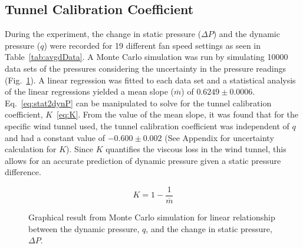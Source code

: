 \documentclass[journal,letterpaper]{IEEEtran}
\begin{document}
\subsection{Tunnel Calibration Coefficient}

During the experiment, the change in static pressure ($\Delta P$) and the dynamic pressure ($q$) were recorded for 19 different fan speed settings as seen in Table~\ref{tab:avgdData}.
A Monte Carlo simulation was run by simulating 10000 data sets of the pressures considering the uncertainty in the pressure readings (Fig.~\ref{fig:Monte}).
A linear regression was fitted to each data set and a statistical analysis of the linear regressions yielded a mean slope ($\overline{m}$) of $0.6249 \pm 0.0006$.
Eq.~\eqref{eq:stat2dynP} can be manipulated to solve for the tunnel calibration coefficient, $K$~\eqref{eq:K}.
From the value of the mean slope, it was found that for the specific wind tunnel used, the tunnel calibration coefficient was independent of $q$ and had a constant value of $-0.600 \pm 0.002$ (See Appendix for uncertainty calculation for $K$). Since $K$ quantifies the viscous loss in the wind tunnel, this allows for an accurate prediction of dynamic pressure given a static pressure difference.

\begin{equation} \label{eq:K}
    K = 1 - \frac{1}{\overline{m}}
\end{equation}

\begin{figure}[H]
    \centering
    
    \caption{Graphical result from Monte Carlo simulation for linear relationship between the dynamic pressure, $q$, and the change in static pressure, $\Delta P$.}
    \label{fig:Monte}
\end{figure}
\end{document}
